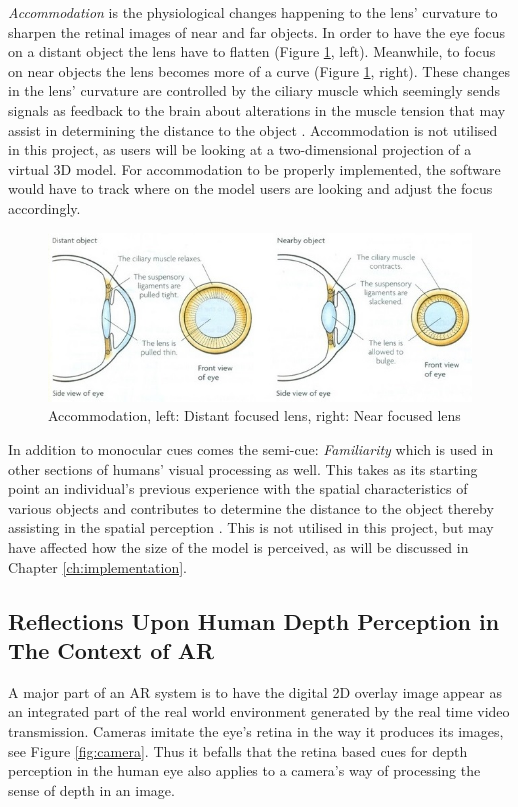 \textit{Accommodation} is the physiological changes happening to the lens’ curvature to sharpen the retinal images of near and far objects. In order to have the eye focus on a distant object the lens have to flatten (Figure \ref{fig:cue10}, left). Meanwhile, to focus on near objects the lens becomes more of a curve (Figure \ref{fig:cue10}, right). These changes in the lens’ curvature are controlled by the ciliary muscle which seemingly sends signals as feedback to the brain about alterations in the muscle tension that may assist in determining the distance to the object \cite{Gale}. Accommodation is not utilised in this project, as users will be looking at a two-dimensional projection of a virtual 3D model. For accommodation to be properly implemented, the software would have to track where on the model users are looking and adjust the focus accordingly.

\begin{figure}[h!]
   \centering
   \includegraphics[width=\textwidth]{figures/cue10.jpg}
   \caption{Accommodation, left: Distant focused lens, right: Near focused lens \cite{Biology2014}}\label{fig:cue10}
\end{figure}

In addition to monocular cues comes the semi-cue: \textit{Familiarity} which is used in other sections of humans’ visual processing as well. This takes as its starting point an individual’s previous experience with the spatial characteristics of various objects and contributes to determine the distance to the object thereby assisting in the spatial perception \cite{Gale}. This is not utilised in this project, but may have affected how the size of the model is perceived, as will be discussed in Chapter \ref{ch:implementation}.

\subsection{Reflections Upon Human Depth Perception in The Context of AR}
A major part of an AR system is to have the digital 2D overlay image appear as an integrated part of the real world environment generated by the real time video transmission. Cameras imitate the eye’s retina in the way it produces its images, see Figure \ref{fig:camera}. Thus it befalls that the retina based cues for depth perception in the human eye also applies to a camera’s way of processing the sense of depth in an image.

